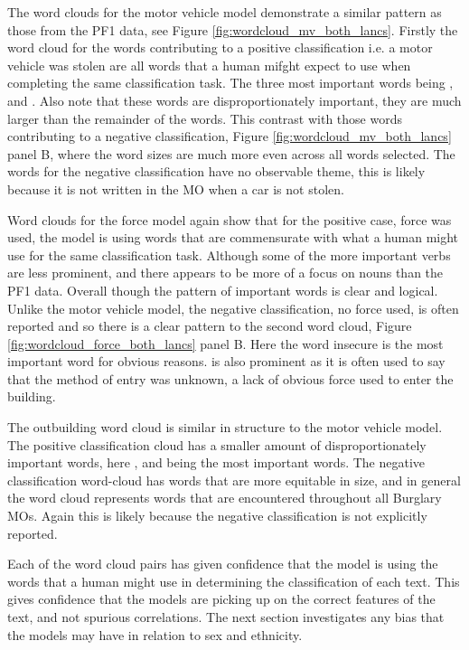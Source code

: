 The word clouds for the motor vehicle model demonstrate a similar pattern as those from the PF1 data, see Figure \ref{fig:wordcloud_mv_both_lancs}. Firstly the word cloud for the words contributing to a positive classification i.e. a motor vehicle was stolen are all words that a human mifght expect to use when completing the same classification task. The three most important words being ,  and . Also note that these words are disproportionately important, they are much larger than the remainder of the words. This contrast with those words contributing to a negative classification, Figure \ref{fig:wordcloud_mv_both_lancs} panel B, where the word sizes are much more even across all words selected. The words for the negative classification have no observable theme, this is likely because it is not written in the MO when a car is not stolen.

Word clouds for the force model again show that for the positive case, force was used, the model is using words that are commensurate with what a human might use for the same classification task. Although some of the more important verbs are less prominent, and there appears to be more of a focus on nouns than the PF1 data. Overall though the pattern of important words is clear and logical. Unlike the motor vehicle model, the negative classification, no force used, is often reported and so there is a clear pattern to the second word cloud, Figure \ref{fig:wordcloud_force_both_lancs} panel B. Here the word insecure is the most important word for obvious reasons.  is also prominent as it is often used to say that the method of entry was unknown, a lack of obvious force used to enter the building. 

The outbuilding word cloud is similar in structure to the motor vehicle model. The positive classification cloud has a smaller amount of disproportionately important words, here ,  and  being the most important words. The negative classification word-cloud has words that are more equitable in size, and in general the word cloud represents words that are encountered throughout all Burglary MOs. Again this is likely because the  negative classification is not explicitly reported.

Each of the word cloud pairs has given confidence that the model is using the words that a human might use in determining the classification of each text. This gives confidence that the models are picking up on the correct features of the text, and not spurious correlations. The next section investigates any bias that the models may have in relation to sex and ethnicity.


